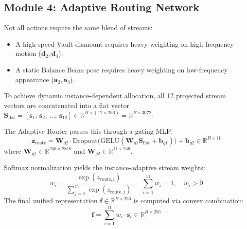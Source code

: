 \documentclass[a4paper, 11pt]{article}
\begin{document}
\subsection{Module 4: Adaptive Routing Network}
Not all actions require the same blend of streams:
\begin{itemize}
    \item A high-speed Vault dismount requires heavy weighting on high-frequency motion ($\mathbf{d}_2, \mathbf{d}_3$).
    \item A static Balance Beam pose requires heavy weighting on low-frequency appearance ($\mathbf{a}_2, \mathbf{a}_3$).
\end{itemize}
To achieve dynamic instance-dependent allocation, all 12 projected stream vectors are concatenated into a flat vector $\mathbf{S}_{\text{flat}} = [\mathbf{s}_1;\, \mathbf{s}_2;\, \ldots;\, \mathbf{s}_{12}] \in \mathbb{R}^{B \times (12 \times 256)} = \mathbb{R}^{B \times 3072}$.

The Adaptive Router passes this through a gating MLP:
\begin{equation}
    \mathbf{z}_{\text{route}} = \mathbf{W}_{g2} \cdot \text{Dropout}\big(\text{GELU}(\mathbf{W}_{g1} \mathbf{S}_{\text{flat}} + \mathbf{b}_{g1})\big) + \mathbf{b}_{g2} \in \mathbb{R}^{B \times 11}
\end{equation}
where $\mathbf{W}_{g1} \in \mathbb{R}^{256 \times 2816}$ and $\mathbf{W}_{g2} \in \mathbb{R}^{11 \times 256}$.

Softmax normalization yields the instance-adaptive stream weights:
\begin{equation}
    w_i = \frac{\exp(z_{\text{route}, i})}{\sum_{j=1}^{11} \exp(z_{\text{route}, j})}, \quad \sum_{i=1}^{11} w_i = 1, \quad w_i > 0
\end{equation}
The final unified representation $\mathbf{f} \in \mathbb{R}^{B \times 256}$ is computed via convex combination:
\begin{equation}
    \mathbf{f} = \sum_{i=1}^{11} w_i \cdot \mathbf{s}_i \in \mathbb{R}^{B \times 256}
\end{equation}
\end{document}
